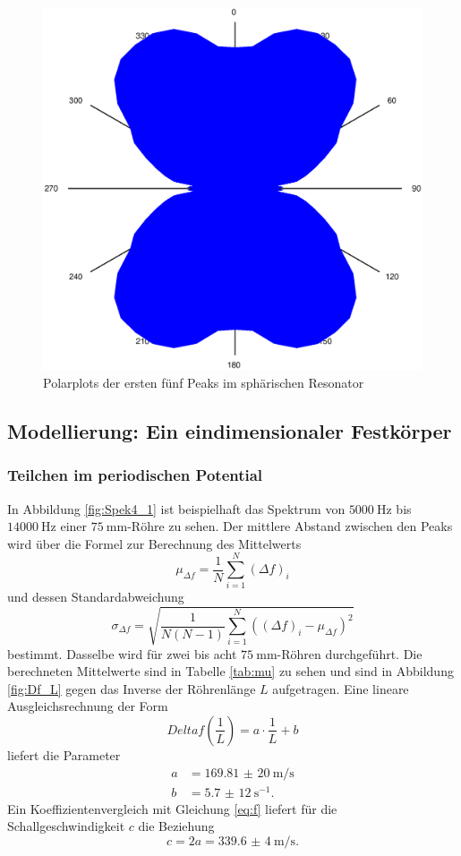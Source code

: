 \begin{figure}
\begin{minipage}{0.45\textwidth}
\end{minipage}
\includegraphics[width=\linewidth*9/20,keepaspectratio]{FP-V23data/2.3_6571.732Hz.eps}
\caption{Polarplots der ersten fünf Peaks im sphärischen Resonator}
\label{fig:polar}
\end{figure}

\subsection{Modellierung: Ein eindimensionaler Festkörper}
\subsubsection{Teilchen im periodischen Potential}

In Abbildung \ref{fig:Spek4_1} ist beispielhaft das Spektrum von  $\SI{5000}{\hertz}$ bis $\SI{14000}{\hertz}$ einer $\SI{75}{\milli\meter}$-Röhre zu sehen.
Der mittlere Abstand zwischen den Peaks wird über die Formel zur Berechnung des Mittelwerts
\[
\mu_{\Delta f} = \frac{1}{N}\sum_{i=1}^{N}(\Delta f)_i
\]
und dessen Standardabweichung
\[
\sigma_{\Delta f} = \sqrt{\frac{1}{N(N-1)}\sum_{i=1}^{N}((\Delta f)_i-\mu_{\Delta f})^2}
\]
bestimmt. Dasselbe wird für zwei bis acht $\SI{75}{\milli\meter}$-Röhren durchgeführt. Die berechneten Mittelwerte sind in Tabelle
\ref{tab:mu} zu sehen und sind in Abbildung \ref{fig:Df_L} gegen das Inverse der Röhrenlänge $L$ aufgetragen. Eine lineare Ausgleichsrechnung der Form 
\[
Delta f\left(\frac{1}{L}\right)= a\cdot\frac{1}{L}+b
\]
liefert die Parameter
\begin{align*}
a&=\SI{169,81(20)}{\meter\per\second}\\
b&=\SI{5,7(12)}{\second^{-1}}\text{.}
\end{align*}
Ein Koeffizientenvergleich mit Gleichung \eqref{eq:f} liefert für die Schallgeschwindigkeit $c$ die Beziehung
\[
c=2 a=\SI{339,6(4)}{\meter\per\second}\text{.}
\]

